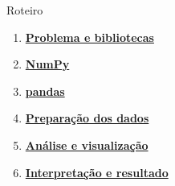 
\begin{frame}[t]{Roteiro}
\begin{enumerate}
  \item \hyperlink{cd-problema}{\textbf{Problema e bibliotecas}}
  \item \hyperlink{cd-numpy}{\textbf{NumPy}}
  \item \hyperlink{cd-pandas}{\textbf{pandas}}
  \item \hyperlink{cd-preparacao}{\textbf{Preparação dos dados}}
  \item \hyperlink{cd-analise}{\textbf{Análise e visualização}}
  \item \hyperlink{cd-resultado}{\textbf{Interpretação e resultado}}
\end{enumerate}
\end{frame}
